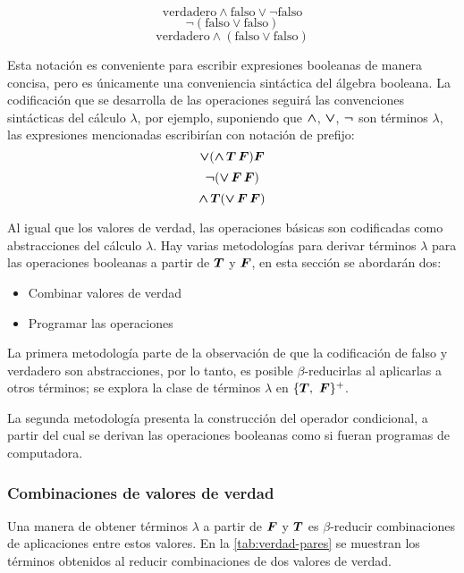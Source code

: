 \[ \mathrm{verdadero} \land \mathrm{falso} \lor \lnot \mathrm{falso} \]
\[ \lnot (\mathrm{falso} \lor \mathrm{falso}) \]
\[ \mathrm{verdadero} \land (\mathrm{falso} \lor \mathrm{falso}) \]

Esta notación es conveniente para escribir expresiones booleanas de manera concisa, pero es únicamente una conveniencia sintáctica del álgebra booleana. La codificación que se desarrolla de las operaciones seguirá las convenciones sintácticas del cálculo $ λ $, por ejemplo, suponiendo que $ \boldsymbol{\land} $, $ \boldsymbol{\lor} $, $ \boldsymbol{\lnot} $ son términos $ λ $, las expresiones mencionadas escribirían con notación de prefijo:
\[ \boldsymbol{\lor} (\boldsymbol{\land}\, \boldsymbol{T}\, \boldsymbol{F}) \boldsymbol{F} \]
\[ \boldsymbol{\lnot} (\boldsymbol{\lor}\, \boldsymbol{F}\, \boldsymbol{F}) \]
\[ \boldsymbol{\land}\, \boldsymbol{T} (\boldsymbol{\lor}\, \boldsymbol{F}\, \boldsymbol{F}) \]

Al igual que los valores de verdad, las operaciones básicas son codificadas como abstracciones del cálculo $ λ $. Hay varias metodologías para derivar términos $ λ $ para las operaciones booleanas a partir de $ \boldsymbol{T} $ y $ \boldsymbol{F} $, en esta sección se abordarán dos:
\begin{itemize}
\item Combinar valores de verdad
\item Programar las operaciones
\end{itemize}
La primera metodología parte de la observación de que la codificación de falso y verdadero son abstracciones, por lo tanto, es posible $ β $-reducirlas al aplicarlas a otros términos; se explora la clase de términos $ λ $ en $ \{ \boldsymbol{T},\ \boldsymbol{F} \}^{+} $.

La segunda metodología presenta la construcción del operador condicional, a partir del cual se derivan las operaciones booleanas como si fueran programas de computadora.

\subsubsection{Combinaciones de valores de verdad}
\label{sec:combinacion-valores}

Una manera de obtener términos $ λ $ a partir de $ \boldsymbol{F} $ y $ \boldsymbol{T} $ es $ β $-reducir combinaciones de aplicaciones entre estos valores. En la \autoref{tab:verdad-pares} se muestran los términos obtenidos al reducir combinaciones de dos valores de verdad.

